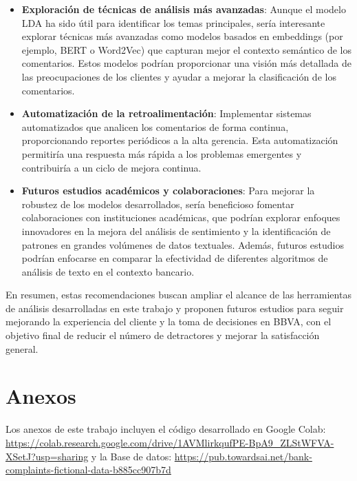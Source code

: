 \documentclass{matematicasud}
\begin{document}
\begin{itemize}
    \item \textbf{Exploración de técnicas de análisis más avanzadas}: Aunque el modelo LDA ha sido útil para identificar los temas principales, sería interesante explorar técnicas más avanzadas como modelos basados en embeddings (por ejemplo, BERT o Word2Vec) que capturan mejor el contexto semántico de los comentarios. Estos modelos podrían proporcionar una visión más detallada de las preocupaciones de los clientes y ayudar a mejorar la clasificación de los comentarios.

    \item \textbf{Automatización de la retroalimentación}: Implementar sistemas automatizados que analicen los comentarios de forma continua, proporcionando reportes periódicos a la alta gerencia. Esta automatización permitiría una respuesta más rápida a los problemas emergentes y contribuiría a un ciclo de mejora continua.

    \item \textbf{Futuros estudios académicos y colaboraciones}: Para mejorar la robustez de los modelos desarrollados, sería beneficioso fomentar colaboraciones con instituciones académicas, que podrían explorar enfoques innovadores en la mejora del análisis de sentimiento y la identificación de patrones en grandes volúmenes de datos textuales. Además, futuros estudios podrían enfocarse en comparar la efectividad de diferentes algoritmos de análisis de texto en el contexto bancario.

\end{itemize}

En resumen, estas recomendaciones buscan ampliar el alcance de las herramientas de análisis desarrolladas en este trabajo y proponen futuros estudios para seguir mejorando la experiencia del cliente y la toma de decisiones en BBVA, con el objetivo final de reducir el número de detractores y mejorar la satisfacción general.


\section{Anexos}
Los anexos de este trabajo incluyen el código desarrollado en Google Colab: \url{https://colab.research.google.com/drive/1AVMlirkqufPE-BpA9_ZLStWFVA-XSetJ?usp=sharing} y la Base de datos: \url{https://pub.towardsai.net/bank-complaints-fictional-data-b885cc907b7d}
\end{document}
